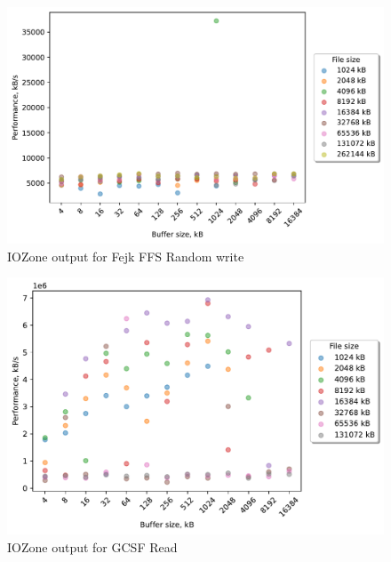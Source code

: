 \begin{figure}[!htb]
	\label{fig:bench_fffs_rnd_write}
	\begin{center}
		\includegraphics[width=1.0\textwidth]{figures/benchmarking/fejk-ffs/Random write.pdf}
	\end{center}
	\caption{IOZone output for Fejk FFS Random write}
\end{figure}

\begin{figure}[!htb]
	\label{fig:bench_gcsf_read}
	\begin{center}
		\includegraphics[width=1.0\textwidth]{figures/benchmarking/gcsf/Read.pdf}
	\end{center}
	\caption{IOZone output for GCSF Read}
\end{figure}

